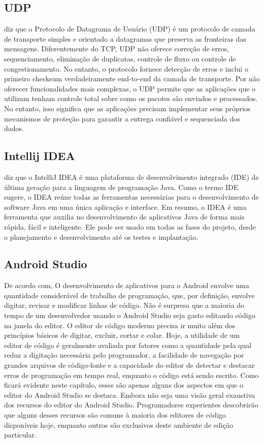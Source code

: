 \documentclass[12pt]{article}
\begin{document}
\subsection{UDP}
\cite{stevens2011tcp} diz que o Protocolo de Datagrama de Usuário (UDP) é um protocolo de camada de transporte simples e orientado a datagramas que preserva as fronteiras das mensagens. Diferentemente do TCP, UDP não oferece correção de erros, sequenciamento, eliminação de duplicatas, controle de fluxo ou controle de congestionamento. No entanto, o protocolo fornece detecção de erros e inclui o primeiro checksum verdadeiramente end-to-end da camada de transporte. Por não oferecer funcionalidades mais complexas, o UDP permite que as aplicações que o utilizam tenham controle total sobre como os pacotes são enviados e processados. No entanto, isso significa que as aplicações precisam implementar seus próprios mecanismos de proteção para garantir a entrega confiável e sequenciada dos dados.

\subsection{Intellij IDEA}
\cite{saunders_fields_belayev_2013} diz que o IntelliJ IDEA é uma plataforma de desenvolvimento integrado (IDE) de última geração para a linguagem de programação Java. Como o termo IDE sugere, o IDEA reúne todas as ferramentas necessárias para o desenvolvimento de software Java em uma única aplicação e interface. Em resumo, o IDEA é uma ferramenta que auxilia no desenvolvimento de aplicativos Java de forma mais rápida, fácil e inteligente. Ele pode ser usado em todas as fases do projeto, desde o planejamento e desenvolvimento até os testes e implantação.


\subsection{Android Studio}
De acordo com\cite{smyth2020android}, O desenvolvimento de aplicativos para o Android envolve uma quantidade considerável de trabalho de programação, que, por definição, envolve digitar, revisar e modificar linhas de código. Não é surpresa que a maioria do tempo de um desenvolvedor usando o Android Studio seja gasto editando código na janela do editor. O editor de código moderno precisa ir muito além dos princípios básicos de digitar, excluir, cortar e colar. Hoje, a utilidade de um editor de código é geralmente avaliada por fatores como a quantidade pela qual reduz a digitação necessária pelo programador, a facilidade de navegação por grandes arquivos de código-fonte e a capacidade do editor de detectar e destacar erros de programação em tempo real, enquanto o código está sendo escrito. Como ficará evidente neste capítulo, esses são apenas alguns dos aspectos em que o editor do Android Studio se destaca. Embora não seja uma visão geral exaustiva dos recursos do editor do Android Studio. Programadores experientes descobrirão que alguns desses recursos são comuns à maioria dos editores de código disponíveis hoje, enquanto outros são exclusivos deste ambiente de edição particular.
\end{document}
